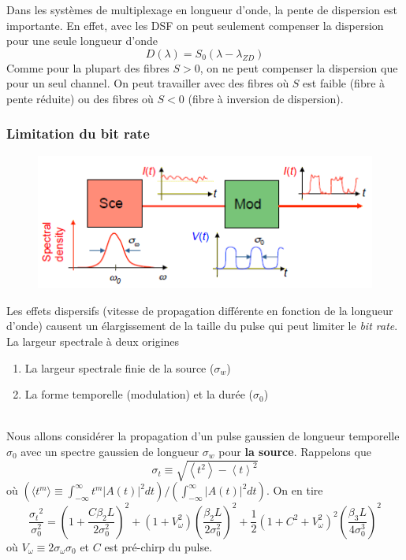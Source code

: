 	Dans les systèmes de multiplexage en longueur d'onde, la pente de dispersion est importante. 
	En effet, avec les DSF on peut seulement compenser la dispersion pour une seule longueur d'onde
	\begin{equation}
	D(\lambda ) = {S_0}(\lambda  - {\lambda _{ZD}})
	\end{equation}
	Comme pour la plupart des fibres $S>0$, on ne peut compenser la dispersion que pour un seul 
	channel. On peut travailler avec des fibres où $S$ est faible (fibre à pente réduite) ou des
	fibres où $S<0$ (fibre à inversion de dispersion).
	
	\subsubsection{Limitation du bit rate}
	\begin{figure}
	\vspace{-5mm}
	\includegraphics[scale=0.5]{ch1/image39}
	\end{figure}
	Les effets dispersifs (vitesse de propagation différente en fonction de la longueur d'onde)
	causent	un élargissement de la taille du pulse qui peut limiter le \textit{bit rate}. La
	largeur spectrale à deux origines
	\begin{enumerate}
	\item La largeur spectrale finie de la source ($\sigma_w$)
	\item La forme temporelle (modulation) et la durée ($\sigma_0$)
	\end{enumerate}\ \\
	
	Nous allons considérer la propagation d'un pulse gaussien de longueur temporelle $\sigma_0$
	avec un spectre gaussien de longueur $\sigma_w$ pour \textbf{la source}. Rappelons que
	\begin{equation}
	{\sigma _t} \equiv \sqrt {\left\langle {{t^2}} \right\rangle  - {{\left\langle t \right\rangle }
	^2}} 
	\end{equation}
	où $\left(\langle t^m\rangle \equiv \int_{-\infty}^\infty t^m |A(t)|^2dt\right)/\left(\int_{-\infty}^\infty	 |A(t)|^2dt\right)$. On en tire
	\begin{equation}
	\frac{{{\sigma _t}^2}}{{\sigma _0^2}} = {\left( {1 + \frac{{C{\beta _2}L}}{{2\sigma _0^2}}} \right)^2} + (1 + V_\omega ^2){\left( {\frac{{{\beta _2}L}}{{2\sigma _0^2}}} \right)^2} + \frac{1}{2}{(1 + {C^2} + V_\omega ^2)^2}{\left( {\frac{{{\beta _3}L}}{{4\sigma _0^3}}} \right)^2}
	\end{equation}
	où $V_\omega \equiv 2\sigma_\omega\sigma_0$ et $C$ est pré-chirp du pulse. \\
	
